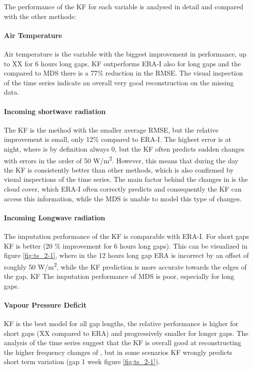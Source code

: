 \documentclass{article}
\begin{document}
The performance of the KF for each variable is analysed in detail and compared with the other methods:

\paragraph{Air Temperature} Air temperature is the variable with the biggest improvement in performance, up to XX for 6 hours long gaps. KF outperforms ERA-I also for long gaps and the compared to MDS there is a 77\% reduction in the RMSE. The visual inspection of the time series indicate an overall very good reconstruction on the missing data. 

\paragraph{Incoming shortwave radiation} The KF is the method with the smaller average RMSE, but the relative improvement is small, only 12\% compared to ERA-I. The highest error is at night, where  is by definition always 0, but the KF often predicts sudden changes with errors in the order of 50 \si{W/m^2}. However, this means that during the day the KF is consistently better than other methods, which is also confirmed by visual inspections of the time series. The main factor behind the changes in  is the cloud cover, which ERA-I often correctly predicts and consequently the KF can access this information, while the MDS is unable to model this type of changes.

\paragraph{Incoming Longwave radiation} The imputation performance of the KF is comparable with ERA-I. For short gaps KF is better (20 \% improvement for 6 hours long gaps). This can be visualized in figure \ref{fig:ts_2-1}, where in the 12 hours long gap ERA is incorrect by an offset of roughly 50 \si{W/m^2}, while the KF prediction is more accurate towards the edges of the gap. KF The imputation performance of MDS is poor, especially for long gaps.

\paragraph{Vapour Pressure Deficit} KF is the best model for all gap lengths, the relative performance is higher for short gaps (XX compared to ERA) and progressively smaller for longer gaps. The analysis of the time series suggest that the KF is overall good at reconstructing the higher frequency changes of , but in some scenarios KF wrongly predicts short term variation (gap 1 week figure \ref{fig:ts_2-1}).
\end{document}
